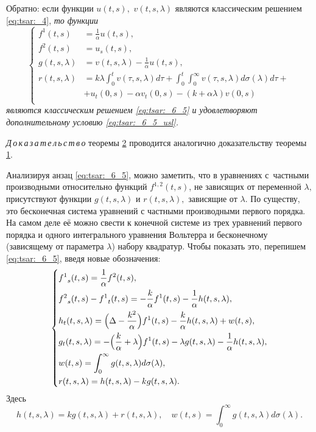 Обратно: если функции $u(t,s),$ $v(t,s,\lambda)$ 
являются классическим решением \rm  \eqref{eq:tsar:_4}, \it то функции 
\begin{equation}
\left\{
\begin{aligned}
f^1(t,s) &= \frac{1}{\alpha} u(t,s) , \\
f^2(t,s) &= u_s(t,s) , \\
g(t,s,\lambda) &=  v(t,s,\lambda) - \frac{1}{\alpha} u(t,s), \\
r(t,s,\lambda) &=  k \lambda \int_0^t v(\tau,s,\lambda) d\tau  
				   + \int_0^t \int_0^{\infty} v(\tau,s,\lambda) d\sigma(\lambda) d\tau +
			\\&
				   + u_t(0,s) - \alpha v_t(0,s) - \left( k + \alpha \lambda \right) v(0,s) \\
\end{aligned}
\right.
\label{eq:tsar:_Z_K_21}
\end{equation}
являются классическим решением \eqref{eq:tsar:_6_5} 
и удовлетворяют дополнительному условию \rm \eqref{eq:tsar:_6_5_usl}.


\smallskip

\textit{Д\,о\,к\,а\,з\,а\,т\,е\,л\,ь\,с\,т\,в\,о} теоремы \hyperlink{tsar:th2}{2} проводится
аналогично доказательству теоремы \hyperlink{tsar:th1}{1}.


Анализируя анзац \eqref{eq:tsar:_6_5}, можно заметить, что в уравнениях с~частными производными относительно функций $f^{1,2}(t,s)$, не зависящих  от переменной $\lambda,$ присутствуют функции $g(t,s,\lambda)$ и $r(t,s,\lambda),$ 
зависящие от $\lambda.$ 
По существу, это бесконечная система уравнений  с частными производными первого порядка. 
На самом деле её можно свести к конечной системе из 
трех уравнений первого порядка и одного интегрального уравнения Вольтерра и бесконечному (зависящему от параметра $\lambda$) набору квадратур. Чтобы показать это, 
перепишем \eqref{eq:tsar:_6_5}, введя новые обозначения: 
\begin{equation}
\left\{
\begin{aligned}
&{f^1}_s(t,s) = \frac{1}{\alpha} {f^2}(t,s),\\
&{f^2}_s(t,s) - {f^1}_t(t,s)= 
							- \frac{k}{\alpha} {f^1}(t,s)
							- \frac{1}{\alpha} h(t,s,\lambda), \\
&h_t(t,s,\lambda) = \Bigl( \Delta - \frac{k^2}{\alpha} \Bigr) {f^1}(t,s)
					- \frac{k}{\alpha} h(t,s,\lambda)
					+ w(t,s) ,\\
&g_t(t,s,\lambda) = - \Bigl( \frac{k}{\alpha} + \lambda \Bigr) {f^1}(t,s)
				- \lambda g(t,s,\lambda)
				- \frac{1}{\alpha} h(t,s,\lambda)
				,\\
&w(t,s)=\int_0^{\infty} g(t,s,\lambda) d\sigma(\lambda),\\
&r(t,s,\lambda) = h(t,s,\lambda) - k g(t,s,\lambda)
				.\\
\end{aligned}
\right. \label{eq:tsar:_6_5_s_1}
\end{equation}
Здесь
$$h(t,s,\lambda) = k g(t,s,\lambda)+ r(t,s,\lambda),\quad w(t,s)=\int_0^{\infty} g(t,s,\lambda) d\sigma(\lambda).$$


